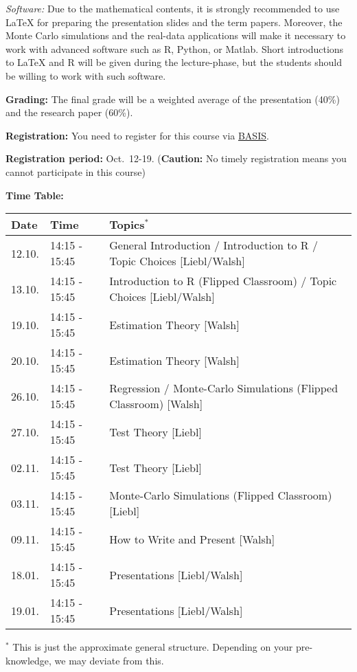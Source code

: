 \documentclass[
]{book}
\begin{document}
\emph{Software:} Due to the mathematical contents, it is strongly recommended to use LaTeX for preparing the presentation slides and the term papers. Moreover, the Monte Carlo simulations and the real-data applications will make it necessary to work with advanced software such as R, Python, or Matlab. Short introductions to LaTeX and R will be given during the lecture-phase, but the students should be willing to work with such software.

\textbf{Grading:} The final grade will be a weighted average of the presentation (40\%) and the research paper (60\%).

\textbf{Registration:} You need to register for this course via \href{https://basis.uni-bonn.de/}{BASIS}.

\textbf{Registration period:} Oct.~12-19. (\textbf{Caution:} No timely registration means you cannot participate in this course)

\hfill\break

\textbf{Time Table:}

\begin{longtable}[]{@{}lll@{}}
\toprule
Date & Time & Topics\(^*\) \\
\midrule
\endhead
12.10. & 14:15 - 15:45 & General Introduction / Introduction to R / Topic Choices {[}Liebl/Walsh{]} \\
13.10. & 14:15 - 15:45 & Introduction to R (Flipped Classroom) / Topic Choices {[}Liebl/Walsh{]} \\
19.10. & 14:15 - 15:45 & Estimation Theory {[}Walsh{]} \\
20.10. & 14:15 - 15:45 & Estimation Theory {[}Walsh{]} \\
26.10. & 14:15 - 15:45 & Regression / Monte-Carlo Simulations (Flipped Classroom) {[}Walsh{]} \\
27.10. & 14:15 - 15:45 & Test Theory {[}Liebl{]} \\
02.11. & 14:15 - 15:45 & Test Theory {[}Liebl{]} \\
03.11. & 14:15 - 15:45 & Monte-Carlo Simulations (Flipped Classroom) {[}Liebl{]} \\
09.11. & 14:15 - 15:45 & How to Write and Present {[}Walsh{]} \\
18.01. & 14:15 - 15:45 & Presentations {[}Liebl/Walsh{]} \\
19.01. & 14:15 - 15:45 & Presentations {[}Liebl/Walsh{]} \\
\bottomrule
\end{longtable}

\(^*\) This is just the approximate general structure. Depending on your pre-knowledge, we may deviate from this.
\end{document}

